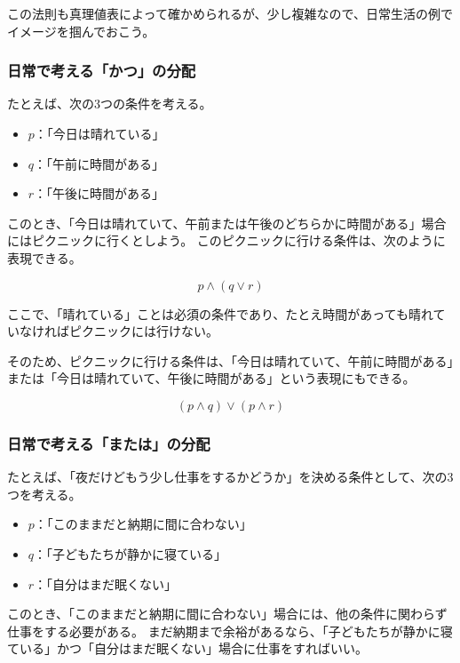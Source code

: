\documentclass[../../imaging-math]{subfiles}
\begin{document}
この法則も真理値表によって確かめられるが、少し複雑なので、日常生活の例でイメージを掴んでおこう。

\subsubsection{日常で考える「かつ」の分配}

たとえば、次の3つの条件を考える。

\begin{itemize}
  \item $p$：「今日は晴れている」
  \item $q$：「午前に時間がある」
  \item $r$：「午後に時間がある」
\end{itemize}

このとき、「今日は晴れていて、午前または午後のどちらかに時間がある」場合にはピクニックに行くとしよう。
このピクニックに行ける条件は、次のように表現できる。

\begin{equation*}
  p \land (q \lor r)
\end{equation*}

ここで、「晴れている」ことは必須の条件であり、たとえ時間があっても晴れていなければピクニックには行けない。

そのため、ピクニックに行ける条件は、「今日は晴れていて、午前に時間がある」または「今日は晴れていて、午後に時間がある」という表現にもできる。

\begin{equation*}
  (p \land q) \lor (p \land r)
\end{equation*}

\subsubsection{日常で考える「または」の分配}

たとえば、「夜だけどもう少し仕事をするかどうか」を決める条件として、次の3つを考える。

\begin{itemize}
  \item $p$：「このままだと納期に間に合わない」
  \item $q$：「子どもたちが静かに寝ている」
  \item $r$：「自分はまだ眠くない」
\end{itemize}

このとき、「このままだと納期に間に合わない」場合には、他の条件に関わらず仕事をする必要がある。
まだ納期まで余裕があるなら、「子どもたちが静かに寝ている」かつ「自分はまだ眠くない」場合に仕事をすればいい。
\end{document}
